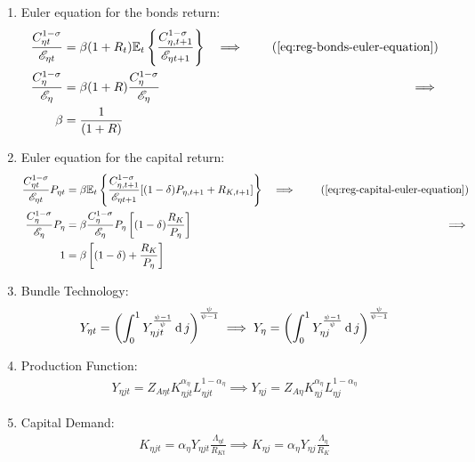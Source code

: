 \documentclass[
thesis.tex
]{subfiles}
\begin{document}
\begin{enumerate}
	\item Euler equation for the bonds return:
	\begin{alignat}{2}
		\frac{ C_{\eta t}^{1-\sigma} }{ \te } &= \beta (1 + R_{t}) \E \left\{ \frac{ C_{\eta, t+1}^{1-\sigma} }{ \te[t+1] } \right\} &\implies \tag{\ref{eq:reg-bonds-euler-equation}} 
		\\
		\frac{ C_{\eta}^{1-\sigma} }{ \te[] } &= \beta (1 + R) \frac{ C_{\eta}^{1-\sigma} }{ \te[] } &\implies \nonumber 
		\\
		\beta &= \frac{1}{(1 + R)} \label{eq:reg-ss-bonds-euler-equation}
	\end{alignat}

	\item Euler equation for the capital return:
	\begin{alignat}{2}
		\frac{ C_{\eta t}^{1-\sigma} }{ \te } P_{\eta t} &= \beta \mathbb{E}_t \left\{ \frac{ C_{\eta, t+1}^{1-\sigma} }{ \te[t+1] } [(1-\delta) P_{\eta, t+1} + R_{K,t+1}] \right\} &\implies \tag{\ref{eq:reg-capital-euler-equation}} \\
		\frac{ C_{\eta}^{1-\sigma} }{ \te[] } P_{\eta} &= \beta \frac{ C_{\eta}^{1-\sigma} }{ \te[] } P_{\eta} \left[ (1-\delta) \frac{R_{K}}{P_{\eta}} \right] &\implies \nonumber \\
		1 &= \beta \left[ (1-\delta) + \frac{R_{K}}{P_{\eta}} \right] \label{eq:reg-ss-capital-euler-equation}
	\end{alignat}

	\item Bundle Technology:
	\begin{align}
		Y_{\eta t} = \left( \int_{0}^{1} Y_{\eta jt}^{\frac{\psi-1}{\psi}} \dif j \right)^{\frac{\psi}{\psi-1}} \implies %
		Y_{\eta} = \left( \int_{0}^{1} Y_{\eta j}^{\frac{\psi-1}{\psi}} \dif j \right)^{\frac{\psi}{\psi-1}} \label{eq:reg-ss-final-goods-firm-bundle-rule}
	\end{align}

	\item Production Function:
	\begin{align}
		Y_{\eta jt} = Z_{A\eta t} K_{\eta jt}^{\alpha_\eta} L_{\eta jt}^{1-{\alpha_\eta}} \implies Y_{\eta j} = Z_{A\eta} K_{\eta j}^{\alpha_\eta} L_{\eta j}^{1-{\alpha_\eta}} \label{eq:reg-ss-int-good-firm-production-function}
	\end{align}

	\item Capital Demand:
	\begin{align}
		K_{\eta jt} = {\alpha_\eta} Y_{\eta jt} \frac{\Lambda_{\eta t}}{R_{Kt}} \implies K_{\eta j} = {\alpha_\eta} Y_{\eta j} \frac{\Lambda_{\eta}}{R_K} \label{eq:reg-ss-int-good-firm-FOC-Kt}
	\end{align}
	

\end{enumerate}
\end{document}
